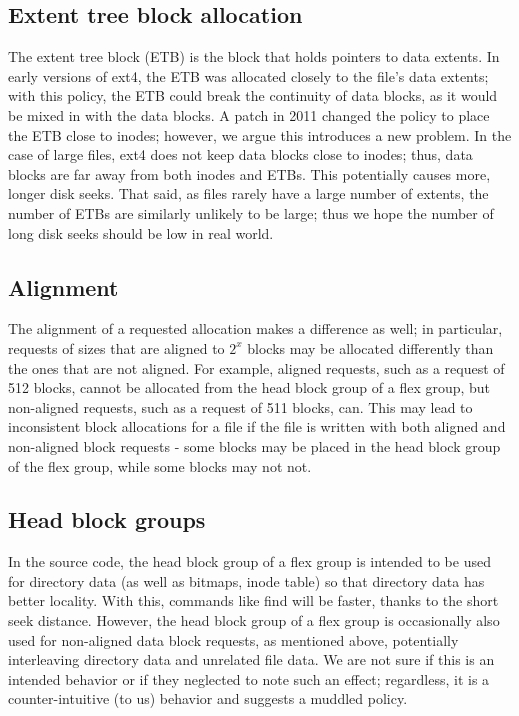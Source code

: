 \documentclass{acm_proc_article-sp}
\begin{document}
\subsection{Extent tree block allocation}
The extent tree block (ETB) is the block that holds pointers to data extents. In early versions of ext4, the ETB was allocated closely to the file's data extents; with this policy, the ETB could break the continuity of data blocks, as it would be mixed in with the data blocks. A patch in 2011 changed the policy to place the ETB close to inodes; however, we argue this introduces a new problem. In the case of large files, ext4 does not keep data blocks close to inodes; thus, data blocks are far away from both inodes and ETBs. This potentially causes more, longer disk seeks. That said, as files rarely have a large number of extents, the number of ETBs are similarly unlikely to be large; thus we hope the number of long disk seeks should be low in real world.

\subsection{Alignment}
The alignment of a requested allocation makes a difference as well; in particular, requests of sizes that are aligned to $2^x$ blocks may be allocated differently than the ones that are not aligned. For example, aligned requests, such as a request of 512 blocks, cannot be allocated from the head block group of a flex group, but non-aligned requests, such as a request of 511 blocks, can. This may lead to inconsistent block allocations for a file if the file is written with both aligned and non-aligned block requests - some blocks may be placed in the head block group of the flex group, while some blocks may not not.

\subsection{Head block groups}
In the source code, the head block group of a flex group is intended to be used for directory data (as well as bitmaps, inode table) so that directory data has better locality. With this, commands like find will be faster, thanks to the short seek distance. However, the head block group of a flex group is occasionally also used for non-aligned data block requests, as mentioned above, potentially interleaving directory data and unrelated file data. We are not sure if this is an intended behavior or if they neglected to note such an effect; regardless, it is a counter-intuitive (to us) behavior and suggests a muddled policy.
\end{document}
